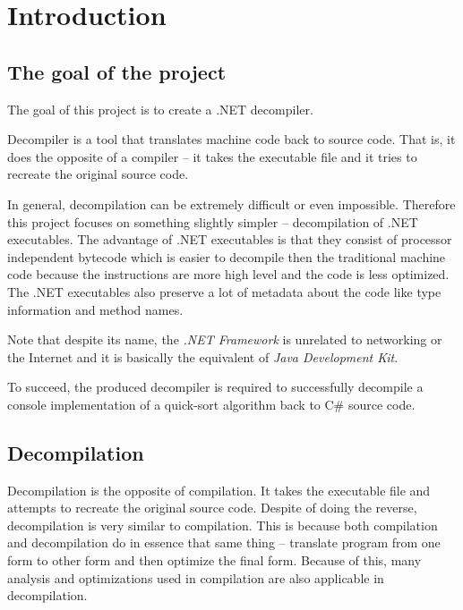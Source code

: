 \documentclass[12pt,twoside,notitlepage]{report}
\begin{document}
\cleardoublepage

\tableofcontents

\listoffigures


\cleardoublepage        %

\setcounter{page}{1}
\pagestyle{headings}

\chapter{Introduction}

\section{The goal of the project}

The goal of this project is to create a .NET decompiler.

Decompiler is a tool that translates machine code back to source
code.  That is, it does the opposite of a compiler -- it takes the 
executable file and it tries to recreate the original source code.

In general, decompilation can be extremely difficult or even impossible.
Therefore this project focuses on something slightly simpler -- 
decompilation of .NET executables.
The advantage of .NET executables is that they consist of processor 
independent bytecode which is easier to decompile then 
the traditional machine code because
the instructions are more high level and the code is less optimized.
The .NET executables also preserve a lot of metadata about the code like
type information and method names.

Note that despite its name, the \emph{.NET Framework} 
is unrelated to networking or the Internet and it is basically the
equivalent of \emph{Java Development Kit}.

To succeed, the produced decompiler is required to successfully decompile
a console implementation of a quick-sort algorithm back to C\# source code.


\section{Decompilation}

Decompilation is the opposite of compilation.  It takes the executable
file and attempts to recreate the original source code.
Despite of doing the reverse, decompilation is very similar to
compilation.  This is because both compilation and decompilation do
in essence that same thing -- translate program from one form to
other form and then optimize the final form.
Because of this, many analysis and optimizations used in compilation
are also applicable in decompilation.
\end{document}
